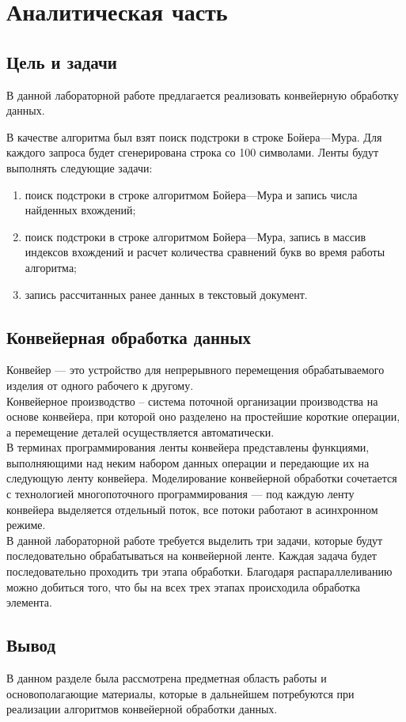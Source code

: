\chapter{Аналитическая часть}
\section{Цель и задачи}
В данной лабораторной работе предлагается реализовать конвейерную обработку данных.


В качестве алгоритма был взят поиск подстроки в строке Бойера---Мура. 
Для каждого запроса будет сгенерирована строка со 100 символами.
Ленты будут выполнять следующие задачи:
\begin{enumerate}[]
	\item поиск подстроки в строке алгоритмом Бойера---Мура и запись числа найденных вхождений;
	\item поиск подстроки в строке алгоритмом Бойера---Мура, запись в массив индексов вхождений и расчет количества сравнений букв во время работы алгоритма;
	\item запись рассчитанных ранее данных в текстовый документ.
\end{enumerate}

\section{Конвейерная обработка данных}

Конвейер --- это устройство для непрерывного перемещения обрабатываемого изделия от одного рабочего к другому.\\

Конвейерное производство -- система поточной организации производства на основе конвейера, при которой оно разделено на простейшие короткие операции, а перемещение деталей осуществляется автоматически.\\

В терминах программирования ленты конвейера представлены функциями, выполняющими над неким набором данных операции и передающие их на следующую ленту конвейера. Моделирование конвейерной обработки сочетается с технологией многопоточного программирования --- под каждую ленту конвейера выделяется отдельный поток, все потоки работают в асинхронном режиме.\\

В данной лабораторной работе требуется выделить три задачи, которые будут последовательно обрабатываться на конвейерной ленте.
Каждая задача будет последовательно проходить три этапа обработки. Благодаря распараллеливанию можно добиться того, что бы на всех трех этапах происходила обработка элемента.


\section*{Вывод}

В данном разделе была рассмотрена предметная область работы и основополагающие материалы, которые в дальнейшем потребуются при реализации алгоритмов конвейерной обработки данных.\\
